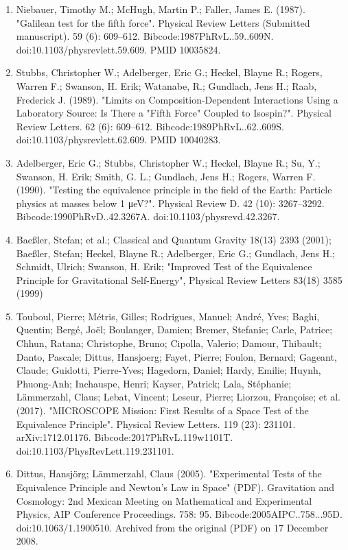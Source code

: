 \begin{enumerate}
\item Niebauer, Timothy M.; McHugh, Martin P.; Faller, James E. (1987). "Galilean test for the fifth force". Physical Review Letters (Submitted manuscript). 59 (6): 609–612. Bibcode:1987PhRvL..59..609N. doi:10.1103/physrevlett.59.609. PMID 10035824.
\item Stubbs, Christopher W.; Adelberger, Eric G.; Heckel, Blayne R.; Rogers, Warren F.; Swanson, H. Erik; Watanabe, R.; Gundlach, Jens H.; Raab, Frederick J. (1989). "Limits on Composition-Dependent Interactions Using a Laboratory Source: Is There a "Fifth Force" Coupled to Isospin?". Physical Review Letters. 62 (6): 609–612. Bibcode:1989PhRvL..62..609S. doi:10.1103/physrevlett.62.609. PMID 10040283.
\item Adelberger, Eric G.; Stubbs, Christopher W.; Heckel, Blayne R.; Su, Y.; Swanson, H. Erik; Smith, G. L.; Gundlach, Jens H.; Rogers, Warren F. (1990). "Testing the equivalence principle in the field of the Earth: Particle physics at masses below 1 μeV?". Physical Review D. 42 (10): 3267–3292. Bibcode:1990PhRvD..42.3267A. doi:10.1103/physrevd.42.3267.
\item Baeßler, Stefan; et al.; Classical and Quantum Gravity 18(13) 2393 (2001); Baeßler, Stefan; Heckel, Blayne R.; Adelberger, Eric G.; Gundlach, Jens H.; Schmidt, Ulrich; Swanson, H. Erik; "Improved Test of the Equivalence Principle for Gravitational Self-Energy", Physical Review Letters 83(18) 3585 (1999)
\item Touboul, Pierre; Métris, Gilles; Rodrigues, Manuel; André, Yves; Baghi, Quentin; Bergé, Joël; Boulanger, Damien; Bremer, Stefanie; Carle, Patrice; Chhun, Ratana; Christophe, Bruno; Cipolla, Valerio; Damour, Thibault; Danto, Pascale; Dittus, Hansjoerg; Fayet, Pierre; Foulon, Bernard; Gageant, Claude; Guidotti, Pierre-Yves; Hagedorn, Daniel; Hardy, Emilie; Huynh, Phuong-Anh; Inchauspe, Henri; Kayser, Patrick; Lala, Stéphanie; Lämmerzahl, Claus; Lebat, Vincent; Leseur, Pierre; Liorzou, Françoise; et al. (2017). "MICROSCOPE Mission: First Results of a Space Test of the Equivalence Principle". Physical Review Letters. 119 (23): 231101. arXiv:1712.01176. Bibcode:2017PhRvL.119w1101T. doi:10.1103/PhysRevLett.119.231101.
\item Dittus, Hansjörg; Lāmmerzahl, Claus (2005). "Experimental Tests of the Equivalence Principle and Newton's Law in Space" (PDF). Gravitation and Cosmology: 2nd Mexican Meeting on Mathematical and Experimental Physics, AIP Conference Proceedings. 758: 95. Bibcode:2005AIPC..758...95D. doi:10.1063/1.1900510. Archived from the original (PDF) on 17 December 2008.

\end{enumerate}
